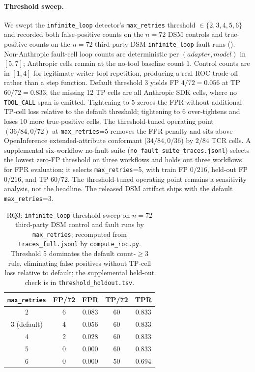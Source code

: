 \documentclass[a4paper,UKenglish,cleveref,autoref,thm-restate]{lipics-v2021}
\begin{document}
\paragraph*{Threshold sweep.}\label{sec:rq3-threshold-sweep}
We swept the \texttt{infinite\_loop} detector's
\texttt{max\_retries} threshold $\in \{2, 3, 4, 5, 6\}$ and recorded
both false-positive counts on the $n = 72$ DSM controls and
true-positive counts on the $n = 72$ third-party DSM
\texttt{infinite\_loop} fault runs ().  Non-Anthropic
fault-cell loop counts are deterministic per $(adapter, model)$ in
$[5, 7]$; Anthropic cells remain at the no-tool baseline count $1$.
Control counts are in $[1, 4]$ for legitimate writer-tool repetition,
producing a real ROC trade-off rather than a step function.  Default
threshold 3 yields FP $4/72 = 0.056$ at TP $60/72 = 0.833$; the
missing 12 TP cells are all Anthropic SDK cells, where no
\texttt{TOOL\_CALL} span is emitted. Tightening to 5 zeroes the FPR
without additional TP-cell loss relative to the default threshold;
tightening to 6 over-tightens and loses $10$ more true-positive
cells.  The threshold-tuned operating point $(36/84, 0/72)$ at
\texttt{max\_retries}=5 removes the FPR penalty and sits above
OpenInference extended-attribute conformant ($34/84, 0/36$) by
$2/84$ TCR cells. A supplemental six-workflow no-fault suite
(\texttt{no\_fault\_suite\_traces.jsonl}) selects the lowest
zero-FP threshold on three workflows and holds out three workflows
for FPR evaluation; it selects \texttt{max\_retries}=5, with train
FP $0/216$, held-out FP $0/216$, and TP $60/72$. The
threshold-tuned operating point remains
a sensitivity analysis, not the headline. The released DSM artifact
ships with the default \texttt{max\_retries}=3.

\begin{table}[htb]
\centering
\small
\caption{RQ3: \texttt{infinite\_loop} threshold sweep on
$n = 72$ third-party DSM control and fault runs by
\texttt{max\_retries}; recomputed from
\texttt{traces\_full.jsonl} by \texttt{compute\_roc.py}. Threshold 5
dominates the default count-$\geq 3$ rule, eliminating false
positives without TP-cell loss relative to default; the supplemental
held-out check is in \texttt{threshold\_holdout.tsv}.}
\label{tab:roc}
\begin{tabular}{ccccc}
\toprule
\textbf{\texttt{max\_retries}} & \textbf{FP/72} & \textbf{FPR} & \textbf{TP/72} & \textbf{TPR} \\
\midrule
2          & 6 & 0.083 & 60 & 0.833 \\
3 (default)& 4 & 0.056 & 60 & 0.833 \\
4          & 2 & 0.028 & 60 & 0.833 \\
5          & 0 & 0.000 & 60 & 0.833 \\
6          & 0 & 0.000 & 50 & 0.694 \\
\bottomrule
\end{tabular}
\end{table}
\end{document}
